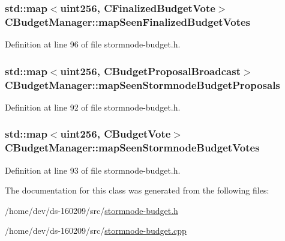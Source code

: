 \subsubsection[{map\+Seen\+Finalized\+Budget\+Votes}]{\setlength{\rightskip}{0pt plus 5cm}std\+::map$<${\bf uint256}, {\bf C\+Finalized\+Budget\+Vote}$>$ C\+Budget\+Manager\+::map\+Seen\+Finalized\+Budget\+Votes}\label{class_c_budget_manager_aecbf6ad23e6f6044672d5619d3e7c40d}


Definition at line 96 of file stormnode-\/budget.\+h.

\hypertarget{class_c_budget_manager_a5336c99bc4c72c185de0391165a67159}{}
\subsubsection[{map\+Seen\+Stormnode\+Budget\+Proposals}]{\setlength{\rightskip}{0pt plus 5cm}std\+::map$<${\bf uint256}, {\bf C\+Budget\+Proposal\+Broadcast}$>$ C\+Budget\+Manager\+::map\+Seen\+Stormnode\+Budget\+Proposals}\label{class_c_budget_manager_a5336c99bc4c72c185de0391165a67159}


Definition at line 92 of file stormnode-\/budget.\+h.

\hypertarget{class_c_budget_manager_af729951208566289252458a01ed9fc7a}{}
\subsubsection[{map\+Seen\+Stormnode\+Budget\+Votes}]{\setlength{\rightskip}{0pt plus 5cm}std\+::map$<${\bf uint256}, {\bf C\+Budget\+Vote}$>$ C\+Budget\+Manager\+::map\+Seen\+Stormnode\+Budget\+Votes}\label{class_c_budget_manager_af729951208566289252458a01ed9fc7a}


Definition at line 93 of file stormnode-\/budget.\+h.



The documentation for this class was generated from the following files\+:\begin{DoxyCompactItemize}
\item 
/home/dev/ds-\/160209/src/\hyperlink{stormnode-budget_8h}{stormnode-\/budget.\+h}\item 
/home/dev/ds-\/160209/src/\hyperlink{stormnode-budget_8cpp}{stormnode-\/budget.\+cpp}\end{DoxyCompactItemize}

